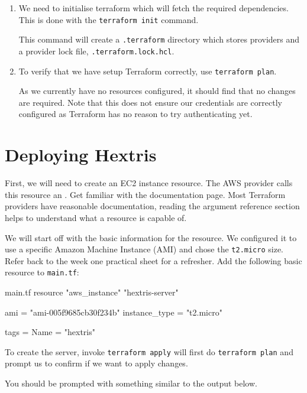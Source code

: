 \documentclass{csse4400}
\begin{document}
\begin{enumerate}
\item We need to initialise terraform which will fetch the required dependencies. This is done with the \texttt{terraform init} command.

This command will create a \texttt{.terraform} directory which stores providers and a provider lock file, \texttt{.terraform.lock.hcl}.

\item To verify that we have setup Terraform correctly, use \texttt{terraform plan}.

As we currently have no resources configured, it should find that no changes are required.
Note that this does not ensure our credentials are correctly configured as Terraform has no reason to try authenticating yet.

\end{enumerate}

\section{Deploying Hextris}
First, we will need to create an EC2 instance resource.
The AWS provider calls this resource an .
Get familiar with the documentation page.
Most Terraform providers have reasonable documentation, reading the argument reference section helps to understand what a resource is capable of.

We will start off with the basic information for the resource.
We configured it to use a specific Amazon Machine Instance (AMI) and chose the \texttt{t2.micro} size.
Refer back to the week one practical sheet for a refresher.
Add the following basic resource to \texttt{main.tf}:

\begin{code}[language=terraform,numbers=none]{main.tf}
resource "aws_instance" "hextris-server" {
    ami           = "ami-005f9685cb30f234b"
    instance_type = "t2.micro"
    
    tags = {
        Name = "hextris"
    }
}      
\end{code}

To create the server, invoke
\texttt{terraform apply} will first do \texttt{terraform plan} and prompt us to confirm if we want to apply changes.


You should be prompted with something similar to the output below.
\end{document}
